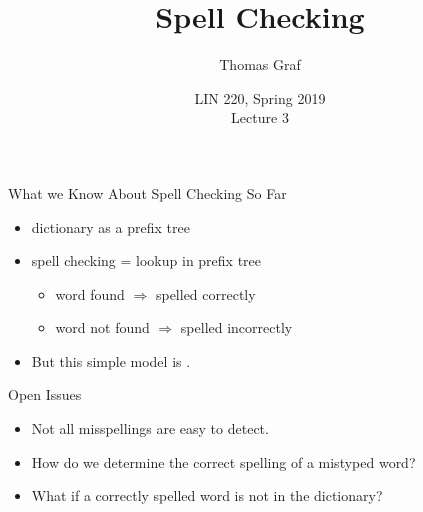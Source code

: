 \documentclass[professionalfonts, xcolor={usenames,svgnames,x11names,table}]{beamer}
\title{Spell Checking}
\author{Thomas Graf}
\institute{Stony Brook University\\\texttt{lin220@thomasgraf.net}}
\date{LIN 220, Spring 2019\\Lecture 3}
\begin{document}
\unnumbered{
\begin{frame}
	\titlepage
\end{frame}
}


\begin{frame}{What we Know About Spell Checking So Far}
    \begin{itemize}
        \item dictionary as a prefix tree
        \item spell checking = lookup in prefix tree
            \begin{itemize}
                \item word found $\Rightarrow$ spelled correctly
                \item word not found $\Rightarrow$ spelled incorrectly
            \end{itemize}
        \item But this simple model is .
    \end{itemize}

    \pause
    \begin{block}{Open Issues}
        \begin{itemize}
            \item Not all misspellings are easy to detect.
            \item How do we determine the correct spelling of a mistyped word?
            \item What if a correctly spelled word is not in the dictionary?\\
        \end{itemize}
    \end{block}
\end{frame}
\end{document}
